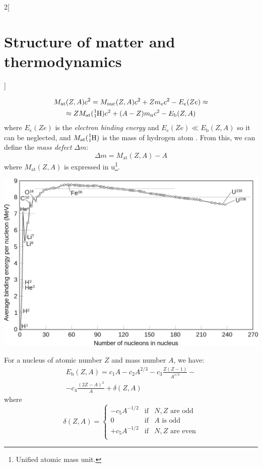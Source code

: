 \documentclass[../../../main.tex]{subfiles}
\begin{document}
\begin{multicols}{2}[\section{Structure of matter and thermodynamics}]
\begin{prop}
\begin{multline*}
      M_\text{at}(Z,A)c^2=M_\text{nuc}(Z,A)c^2+Zm_ec^2-E_e(Ze)\approx\\\approx ZM_\text{at}(\ce{^1_1H})c^2+(A-Z)m_\text{n}c^2-E_\text{b}(Z,A)
    \end{multline*}
    where $E_e(Ze)$ is the \textit{electron binding energy} and $E_e(Ze)\ll E_\text{b}(Z,A)$ so it can be neglected, and $M_\text{at}(\ce{^1_1H})$ is the mass of hydrogen atom . From this, we can define the \textit{mass defect $\Delta m$}:
    $$\Delta m=M_\text{at}(Z,A)-A$$ where $M_\text{at}(Z,A)$ is expressed in u\footnote{Unified atomic mass unit.}.
  \end{prop}
  \begin{center}
    \begin{minipage}{\linewidth}
      \centering
      \includegraphics[width=\linewidth]{Images/Binding_energy.png}
    \end{minipage}
  \end{center}
  \begin{prop}
    For a nucleus of atomic number $Z$ and mass number $A$, we have:
    \begin{multline*}
      E_\text{b}(Z,A)=c_1A-c_2A^{2/3}-c_3\frac{Z(Z-1)}{A^{1/3}}-\\-c_4\frac{{(2Z-A)}^2}{A}+\delta(Z,A)
    \end{multline*}
    where
    $$\delta(Z,A)=\left\{
      \begin{array}{lll}
        -c_5A^{-1/2} & \text{if} & N, Z\text{ are odd}  \\
        0            & \text{if} & A\text{ is odd}      \\
        +c_5A^{-1/2} & \text{if} & N, Z\text{ are even} \\

\end{array}$$
\end{prop}
\end{multicols}
\end{document}
